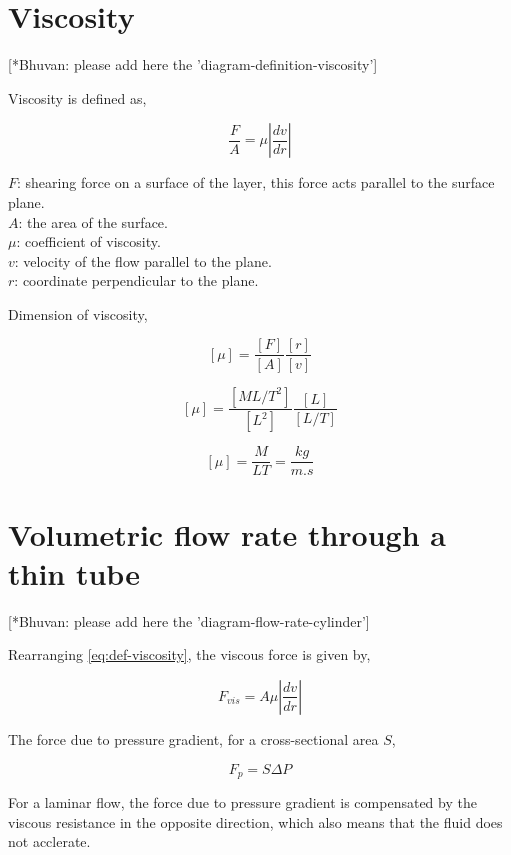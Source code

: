 \section{Viscosity}

	[*Bhuvan: please add here the 'diagram-definition-viscosity']
	
	Viscosity is defined as,
	
	\begin{equation} \label{eq:def-viscosity}
		\frac{F}{A} = \mu \left| \frac{dv}{dr} \right|
	\end{equation}
	
	$F$: shearing force on a surface of the layer, this force acts parallel to the surface plane.\\
	$A$: the area of the surface.\\
	$\mu$: coefficient of viscosity.\\
	$v$: velocity of the flow parallel to the plane.\\
	$r$: coordinate perpendicular to the plane.
	
	Dimension of viscosity,
	
	\[ [\mu] = \frac{[F]}{[A]} \frac{[r]}{[v]} \]
	
	\[ [\mu] = \frac{[ML/T^2]}{[L^2]} \frac{[L]}{[L/T]} \]
	
	\begin{equation} \label{eq:diamension-mu}
		[\mu] = \frac{M}{LT} = \frac{kg}{m.s}
	\end{equation}


\section{Volumetric flow rate through a thin tube}
	
	[*Bhuvan: please add here the 'diagram-flow-rate-cylinder']
	
	Rearranging \ref{eq:def-viscosity}, the viscous force is given by,
	
	\begin{equation} \label{eq:force-viscous}
		F_{vis} = A \mu \left| \frac{dv}{dr} \right|
	\end{equation}
	
	The force due to pressure gradient, for a cross-sectional area $S$,
	
	\begin{equation} \label{eq:force-pressure-grad}
		F_{p} = S \Delta P
	\end{equation}
	
	For a laminar flow, the force due to pressure gradient is compensated by the viscous resistance in the opposite direction, which also means that the fluid does not acclerate.
	
